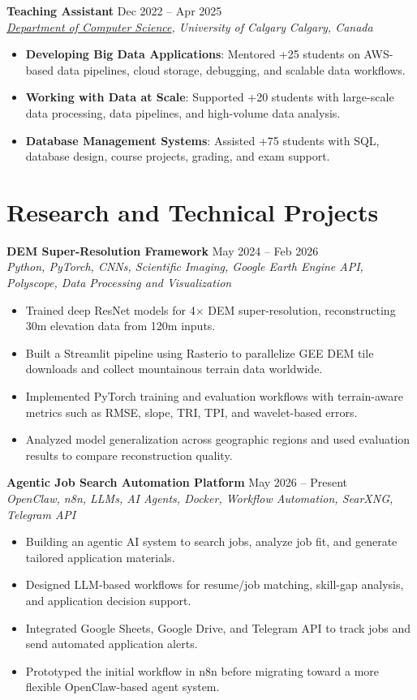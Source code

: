 \documentclass[a4paper,10pt]{article}
\newcommand{\resumeSubheading}[4]{
    \textbf{#1} \hfill #2 \\
    \textit{#3} \hfill \textit{#4}
}
\begin{document}
\resumeSubheading
{Teaching Assistant}
{Dec 2022 -- Apr 2025}
{\href{https://science.ucalgary.ca/computer-science} {Department of Computer Science}, University of Calgary}
{Calgary, Canada}
\begin{itemize}[leftmargin=0.25in]
    \item \textbf{Developing Big Data Applications}: Mentored +25 students on AWS-based data pipelines, cloud storage, debugging, and scalable data workflows.
    \item \textbf{Working with Data at Scale}: Supported +20 students with large-scale data processing, data pipelines, and high-volume data analysis.
    \item \textbf{Database Management Systems}: Assisted +75 students with SQL, database design, course projects, grading, and exam support.
\end{itemize}

\section*{Research and Technical Projects}

\noindent
\textbf{DEM Super-Resolution Framework} \hfill May 2024 -- Feb 2026 \\
\textit{Python, PyTorch, CNNs, Scientific Imaging, Google Earth Engine API, Polyscope, Data Processing and Visualization}
\begin{itemize}[leftmargin=0.25in]
    \item Trained deep ResNet models for 4$\times$ DEM super-resolution, reconstructing 30m elevation data from 120m inputs.
    \item Built a Streamlit pipeline using Rasterio to parallelize GEE DEM tile downloads and collect mountainous terrain data worldwide.
    \item Implemented PyTorch training and evaluation workflows with terrain-aware metrics such as RMSE, slope, TRI, TPI, and wavelet-based errors.
    \item Analyzed model generalization across geographic regions and used evaluation results to compare reconstruction quality.
\end{itemize}

\noindent
\textbf{Agentic Job Search Automation Platform} \hfill May 2026 -- Present \\
\textit{OpenClaw, n8n, LLMs, AI Agents, Docker, Workflow Automation, SearXNG, Telegram API}
\begin{itemize}[leftmargin=0.25in]
    \item Building an agentic AI system to search jobs, analyze job fit, and generate tailored application materials.
    \item Designed LLM-based workflows for resume/job matching, skill-gap analysis, and application decision support.
    \item Integrated Google Sheets, Google Drive, and Telegram API to track jobs and send automated application alerts.
    \item Prototyped the initial workflow in n8n before migrating toward a more flexible OpenClaw-based agent system.
\end{itemize}
\end{document}
